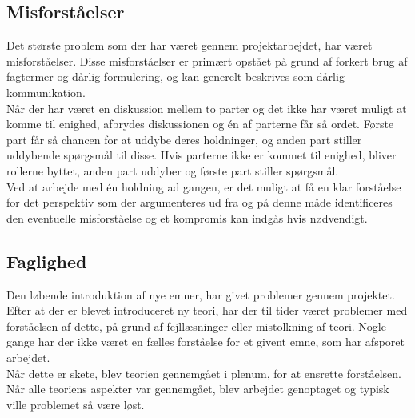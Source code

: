 \subsection{Misforståelser}
Det største problem som der har været gennem projektarbejdet, har været misforståelser. Disse misforståelser er primært opstået på grund af forkert brug af fagtermer og dårlig formulering, og kan generelt beskrives som dårlig kommunikation.\\
Når der har været en diskussion mellem to parter og det ikke har været muligt at komme til enighed, afbrydes diskussionen og én af parterne får så ordet. Første part får så chancen for at uddybe deres holdninger, og anden part stiller uddybende spørgsmål til disse. Hvis parterne ikke er kommet til enighed, bliver rollerne byttet, anden part uddyber og første part stiller spørgsmål.\\
Ved at arbejde med én holdning ad gangen, er det muligt at få en klar forståelse for det perspektiv som der argumenteres ud fra og på denne måde identificeres den eventuelle misforståelse og et kompromis kan indgås hvis nødvendigt.
\subsection{Faglighed}
Den løbende introduktion af nye emner, har givet problemer gennem projektet. Efter at der er blevet introduceret ny teori, har der til tider været problemer med forståelsen af dette, på grund af fejllæsninger eller mistolkning af teori. Nogle gange har der ikke været en fælles forståelse for et givent emne, som har afsporet arbejdet.\\
Når dette er skete, blev teorien gennemgået i plenum, for at ensrette forståelsen. Når alle teoriens aspekter var gennemgået, blev arbejdet genoptaget og typisk ville problemet så være løst.
